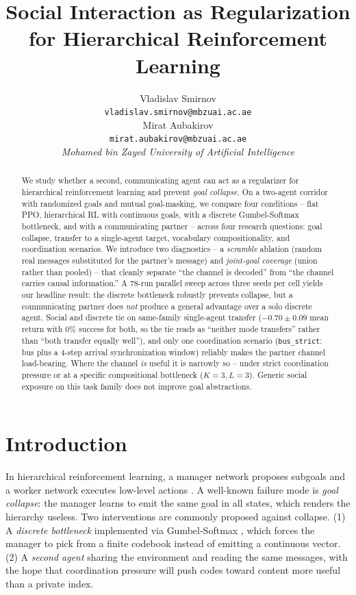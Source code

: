 \documentclass{article}
\title{Social Interaction as Regularization\\for Hierarchical Reinforcement Learning}
\author{%
  Vladislav Smirnov \\
  \texttt{vladislav.smirnov@mbzuai.ac.ae} \\
  \And
  Mirat Aubakirov \\
  \texttt{mirat.aubakirov@mbzuai.ac.ae} \\
  \AND
  \textit{Mohamed bin Zayed University of Artificial Intelligence}
}
\begin{document}
\maketitle

\begin{abstract}
We study whether a second, communicating agent can act as a regularizer for
hierarchical reinforcement learning and prevent \emph{goal collapse}. On a
two-agent corridor with randomized goals and mutual goal-masking, we compare
four conditions -- flat PPO, hierarchical RL with continuous goals, with a
discrete Gumbel-Softmax bottleneck, and with a communicating partner -- across
four research questions: goal collapse, transfer to a single-agent target,
vocabulary compositionality, and coordination scenarios. We introduce two
diagnostics -- a \emph{scramble} ablation (random real messages substituted
for the partner's message) and \emph{joint-goal coverage} (union rather than
pooled) -- that cleanly separate ``the channel is decoded'' from ``the channel
carries causal information.'' A 78-run parallel sweep across three seeds per
cell yields our headline result: the discrete bottleneck robustly prevents
collapse, but a communicating partner does \emph{not} produce a general
advantage over a solo discrete agent. Social and discrete tie on same-family
single-agent transfer ($-0.70 \pm 0.09$ mean return with $0\%$ success
for both, so the tie reads as ``neither mode transfers'' rather than
``both transfer equally well''), and only one coordination scenario
(\texttt{bus\_strict}: bus plus a 4-step arrival synchronization
window) reliably makes the partner channel load-bearing.
Where the channel \emph{is} useful it is narrowly so -- under strict
coordination pressure or at a specific compositional bottleneck
($K{=}3, L{=}3$). Generic social exposure on this task family does not
improve goal abstractions.
\end{abstract}

\section{Introduction}

In hierarchical reinforcement learning, a manager network proposes subgoals
and a worker network executes low-level actions
\citep{nachum2018hiro,vezhnevets2017feudal,bacon2017option}. A well-known
failure mode is \emph{goal collapse}: the manager learns to emit the same
goal in all states, which renders the hierarchy useless. Two interventions
are commonly proposed against collapse. (1) A \emph{discrete bottleneck}
implemented via Gumbel-Softmax \citep{jang2017gumbel}, which forces the
manager to pick from a finite codebook instead of emitting a continuous
vector. (2) A \emph{second agent} sharing the environment and reading the
same messages, with the hope that coordination pressure will push codes
toward content more useful than a private index.
\end{document}
